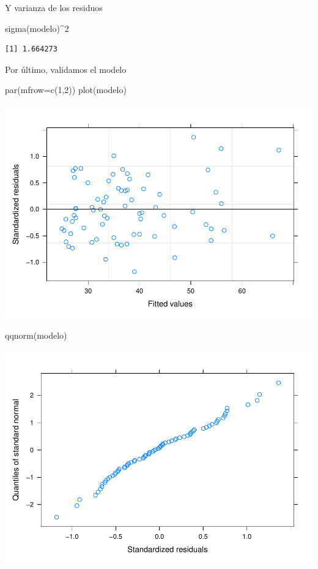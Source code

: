 \documentclass[
]{book}
\newenvironment{Shaded}{\begin{snugshade}}{\end{snugshade}}
\newcommand{\AttributeTok}[1]{\textcolor[rgb]{0.77,0.63,0.00}{#1}}
\newcommand{\DecValTok}[1]{\textcolor[rgb]{0.00,0.00,0.81}{#1}}
\newcommand{\FunctionTok}[1]{\textcolor[rgb]{0.00,0.00,0.00}{#1}}
\newcommand{\NormalTok}[1]{#1}
\newcommand{\SpecialCharTok}[1]{\textcolor[rgb]{0.00,0.00,0.00}{#1}}
\begin{document}
Y varianza de los residuos

\begin{Shaded}
\begin{Highlighting}[]
\FunctionTok{sigma}\NormalTok{(modelo)}\SpecialCharTok{\^{}}\DecValTok{2}
\end{Highlighting}
\end{Shaded}

\begin{verbatim}
[1] 1.664273
\end{verbatim}

Por último, validamos el modelo

\begin{Shaded}
\begin{Highlighting}[]
\FunctionTok{par}\NormalTok{(}\AttributeTok{mfrow=}\FunctionTok{c}\NormalTok{(}\DecValTok{1}\NormalTok{,}\DecValTok{2}\NormalTok{))}
\FunctionTok{plot}\NormalTok{(modelo)}
\end{Highlighting}
\end{Shaded}

\includegraphics{fig_out/unnamed-chunk-110-1.pdf}

\begin{Shaded}
\begin{Highlighting}[]
\FunctionTok{qqnorm}\NormalTok{(modelo)}
\end{Highlighting}
\end{Shaded}

\includegraphics{fig_out/unnamed-chunk-110-2.pdf}
\end{document}
